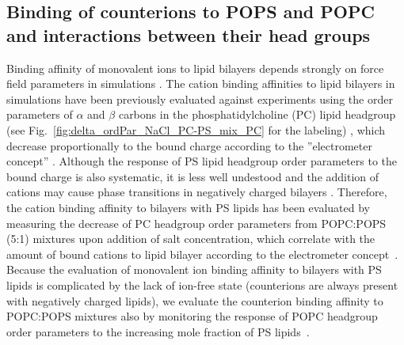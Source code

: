 \documentclass[journal=jpcbfk,manuscript=article]{achemso}
\begin{document}
\subsection{Binding of counterions to POPS and POPC and interactions between their head groups}
Binding affinity of monovalent ions to lipid bilayers depends strongly on
force field parameters in simulations \cite{catte16,NMRlipidsIV}.
The cation binding affinities to lipid bilayers in simulations have been previously evaluated
against experiments using the order parameters of $\alpha$ and $\beta$ carbons in the
phosphatidylcholine (PC) lipid headgroup (see Fig.~\ref{fig:delta_ordPar_NaCl_PC-PS_mix_PC} for the labeling) \cite{catte16,melcr18,NMRlipidsIV},
which decrease proportionally to the bound charge according to the ''electrometer concept'' \citep{seelig87}.
Although the response of PS lipid headgroup order parameters to the bound charge is also systematic,
it is less well undestood and the addition of cations may cause phase transitions in negatively charged
bilayers \cite{feigenson86,mattai89,roux91,roux90}.
Therefore, the cation binding affinity to bilayers with PS lipids has been evaluated by measuring the decrease
of PC headgroup order parameters from POPC:POPS (5:1) mixtures upon addition of salt concentration,
which correlate with the amount of bound cations to lipid bilayer according to the
electrometer concept~\cite{akutsu81,altenbach84,seelig87,roux90,catte16,NMRlipidsIV}.
Because the evaluation of monovalent ion binding affinity to bilayers with
PS lipids is complicated by the lack of ion-free state (counterions are always present with negatively charged lipids),
we evaluate the counterion binding affinity to POPC:POPS mixtures also by monitoring
the response of POPC headgroup order parameters to the increasing mole fraction of PS lipids~\cite{NMRlipidsIV}.
\end{document}
